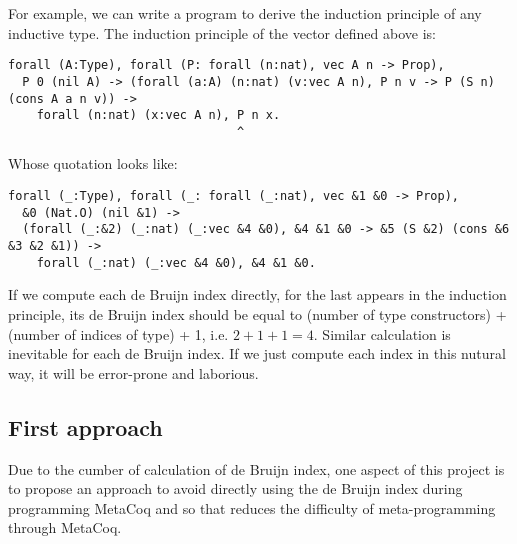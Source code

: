 \documentclass[a4paper,UKenglish,cleveref, autoref, thm-restate]{lipics-v2021}
\begin{document}
For example, we can write a program to derive the induction principle of any inductive type. The induction principle of the vector defined above is:
\begin{lstlisting}[language = {Coq}, basicstyle = \small]
forall (A:Type), forall (P: forall (n:nat), vec A n -> Prop),
  P 0 (nil A) -> (forall (a:A) (n:nat) (v:vec A n), P n v -> P (S n) (cons A a n v)) ->
    forall (n:nat) (x:vec A n), P n x.
                                ^ 
\end{lstlisting}

Whose quotation looks like:
\begin{lstlisting}[language = {Coq}, basicstyle = \small]
forall (_:Type), forall (_: forall (_:nat), vec &1 &0 -> Prop),
  &0 (Nat.O) (nil &1) -> 
  (forall (_:&2) (_:nat) (_:vec &4 &0), &4 &1 &0 -> &5 (S &2) (cons &6 &3 &2 &1)) ->
    forall (_:nat) (_:vec &4 &0), &4 &1 &0.
\end{lstlisting}

If we compute each de Bruijn index directly, for the last  appears in the induction principle, its de Bruijn index should be equal to (number of type constructors) + (number of indices of type) + 1, i.e. $2 + 1 + 1 = 4$. Similar calculation is inevitable for each de Bruijn index. If we just compute each index in this nutural way, it will be error-prone and laborious.




\subsection{First approach}
Due to the cumber of calculation of de Bruijn index, one aspect of this project is to propose an approach to avoid directly using the de Bruijn index during programming MetaCoq and so that reduces the difficulty of meta-programming through MetaCoq.




\end{document}
